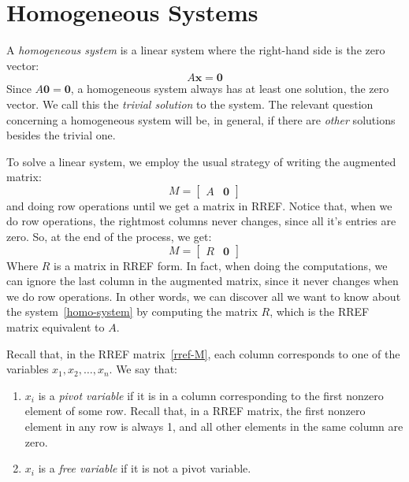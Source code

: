 \documentclass[12pt]{article}
\begin{document}
\section{Homogeneous Systems}

A \emph{homogeneous system} is a linear system where the right-hand side is the zero vector:
\begin{equation}
\label{homo-system}
A\mathbf{x}=\mathbf{0}
\end{equation}
Since $A\mathbf{0}=\mathbf{0}$, a homogeneous system always has at least one solution, the zero vector. We call this the \emph{trivial solution} to the system. The relevant question concerning a homogeneous system will be, in general, if there are \emph{other} solutions besides the trivial one.

To solve a linear system, we employ the usual strategy of writing the augmented matrix:
\[
M=\begin{bmatrix} A & \mathbf{0}\end{bmatrix}
\]
and doing row operations until we get a matrix in RREF. Notice that, when we do row operations, the rightmost columns never changes, since all it's entries are zero. So, at the end of the process, we get:
\begin{equation}
\label{rref-M}
M = \begin{bmatrix}R & \mathbf{0}\end{bmatrix}
\end{equation}
Where $R$ is a matrix in RREF form. In fact, when doing the computations, we can ignore the last column in the augmented matrix, since it never changes when we do row operations. In other words, we can discover all we want to know about the system~\ref{homo-system} by computing the matrix $R$, which is the RREF matrix equivalent to $A$.

Recall that, in the RREF matrix~\ref{rref-M}, each column corresponds to one of the variables $x_1,x_2,\ldots,x_n$. We say that:
\begin{enumerate}
\item $x_i$ is a \emph{pivot variable} if it is in a column corresponding to the first nonzero element of some row. Recall that, in a RREF matrix, the first nonzero element in any row is always 1, and all other elements in the same column are zero.
\item $x_i$ is a \emph{free variable} if it is not a pivot variable. 
\end{enumerate}
\end{document}
